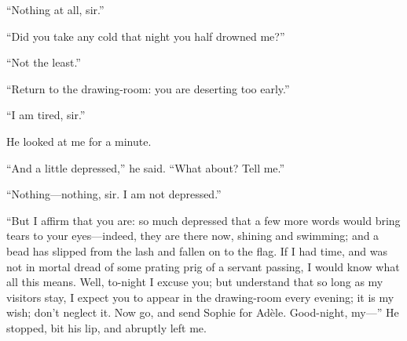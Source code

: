 \enquote{Nothing at all, sir.}

\enquote{Did you take any cold that night you half drowned me?}

\enquote{Not the least.}

\enquote{Return to the drawing-room: you are deserting too early.}

\enquote{I am tired, sir.}

He looked at me for a minute.

\enquote{And a little depressed,} he said. \enquote{What about? Tell
	me.}

\enquote{Nothing---nothing, sir. I am not depressed.}

\enquote{But I affirm that you are: so much depressed that a few more
	words would bring tears to your eyes---indeed, they are there now,
	shining and swimming; and a bead has slipped from the lash and fallen on
	to the flag. If I had time, and was not in mortal dread of some prating
	prig of a servant passing, I would know what all this means. Well,
	to-night I excuse you; but understand that so long as my visitors stay,
	I expect you to appear in the drawing-room every evening; it is my wish;
	don't neglect it. Now go, and send Sophie for Adèle. Good-night,
	my---} He stopped, bit his lip, and abruptly left me.